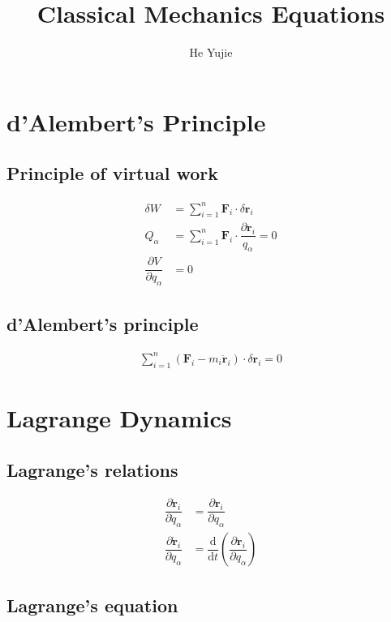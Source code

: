 \documentclass[10pt, a4paper]{article}
\title{Classical Mechanics Equations}
\author{He Yujie}
\def\D{\partial}
\begin{document}
\maketitle

\begin{multicols}{2}

\section{d'Alembert's Principle}

\subsection{Principle of virtual work}

\begin{align}
	\delta W &= \sum^n_{i = 1} \bm{F}_i \cdot \delta \bm{r}_i\\
	Q_\alpha &= \sum^n_{i = 1} \bm{F}_i \cdot \dfrac{\D \bm{r}_i}{q_\alpha} = 0\\
	\dfrac{\D V}{\D q_\alpha} &= 0
\end{align}

\subsection{d'Alembert's principle}

\begin{align}
	\sum^n_{i = 1} \left( \bm{F}_i - m_i \ddot{\bm{r}}_i\right) \cdot \delta \bm{r}_i = 0
\end{align}

\section{Lagrange Dynamics}

\subsection{Lagrange's relations}

	\begin{align}
		\dfrac{\D \dot{\bm{r}} _i}{\D \dot{q} _\alpha} &= \dfrac{\D \bm{r} _i}{\D q_\alpha}\\
		\dfrac{\D \dot{\bm{r}} _i}{\D q_\alpha} &= \dfrac{\mathrm{d}}{\mathrm{d}t} \left(\dfrac{\D \bm{r} _i}{\D q_\alpha}\right)
	\end{align}

\subsection{Lagrange's equation}


\end{multicols}
\end{document}
